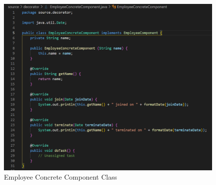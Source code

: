 \newpage
\begin{figure}[!htb]
    \centering
    \includegraphics[width=\textwidth]{fig/Decorator/employee_concrete_component_class.png}
    \caption{Employee Concrete Component Class}
    \label{fig:employee_concrete_component_class}
\end{figure}

